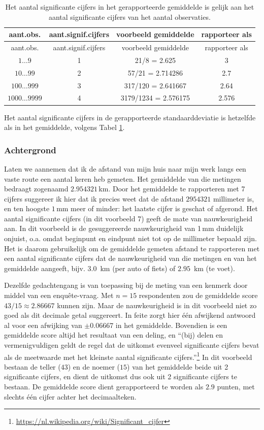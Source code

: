 \documentclass[
]{book}
\begin{document}
\begin{longtable}[]{@{}cccc@{}}
\caption{\label{tab:signifcijfersgemiddelde} Het aantal significante cijfers in het gerapporteerde gemiddelde is gelijk aan het aantal significante cijfers van het aantal observaties.}\tabularnewline
\toprule
aant.obs. & aant.signif.cijfers & voorbeeld gemiddelde & rapporteer als\tabularnewline
\midrule
\endfirsthead
\toprule
aant.obs. & aant.signif.cijfers & voorbeeld gemiddelde & rapporteer als\tabularnewline
\midrule
\endhead
\(1\dots9\) & 1 & 21/8 = 2.625 & 3\tabularnewline
\(10\dots99\) & 2 & 57/21 = 2.714286 & 2.7\tabularnewline
\(100\dots999\) & 3 & 317/120 = 2.641667 & 2.64\tabularnewline
\(1000\dots9999\) & 4 & 3179/1234 = 2.576175 & 2.576\tabularnewline
\bottomrule
\end{longtable}

Het aantal significante cijfers in de gerapporteerde standaarddeviatie
is hetzelfde als in het gemiddelde, volgens
Tabel \ref{tab:signifcijfersgemiddelde}.

\hypertarget{achtergrond}{%
\subsubsection{Achtergrond}\label{achtergrond}}

Laten we aannemen dat ik de afstand van mijn huis naar mijn werk langs
een vaste route een aantal keren heb gemeten. Het gemiddelde van die
metingen bedraagt zogenaamd \(2.954321\) km. Door het gemiddelde te
rapporteren met 7 cijfers suggereer ik hier dat ik precies weet dat de
afstand \(2954321\) millimeter is, en ten hoogste \(1\) mm meer of minder:
het laatste cijfer is geschat of afgerond. Het aantal significante
cijfers (in dit voorbeeld 7) geeft de mate van nauwkeurigheid aan. In
dit voorbeeld is de gesuggereerde nauwkeurigheid van 1 mm duidelijk
onjuist, o.a. omdat beginpunt en eindpunt niet tot op de millimeter
bepaald zijn. Het is daarom gebruikelijk om de gemiddelde gemeten
afstand te rapporteren met een aantal significante cijfers dat de
nauwkeurigheid van die metingen en van het gemiddelde aangeeft, bijv.
\(3.0\)~km (per auto of fiets) of \(2.95\)~km (te voet).

Dezelfde gedachtengang is van toepassing bij de meting van een kenmerk
door middel van een enquête-vraag. Met \(n=15\) respondenten zou de
gemiddelde score \(43/15 \approx 2.86667\) kunnen zijn. Maar de
nauwkeurigheid is in dit voorbeeld niet zo goed als dit decimale getal
suggereert. In feite zorgt hier één afwijkend antwoord al voor een
afwijking van \(\pm0.06667\) in het gemiddelde. Bovendien is een
gemiddelde score altijd het resultaat van een deling, en ``(bij) delen
en vermenigvuldigen geldt de regel dat de uitkomst evenveel significante
cijfers bevat als de meetwaarde met het kleinste aantal significante
cijfers.''\footnote{\url{https://nl.wikipedia.org/wiki/Significant_cijfer}} In dit voorbeeld bestaan de teller (\(43\)) en de noemer
(\(15\)) van het gemiddelde beide uit 2 significante cijfers, en dient de
uitkomst dus ook uit 2 significante cijfers te bestaan. De gemiddelde
score dient gerapporteerd te worden als \(2.9\) punten, met slechts één
cijfer achter het decimaalteken.
\end{document}
